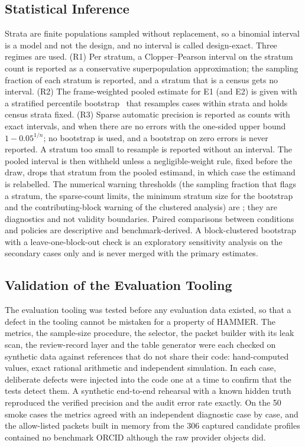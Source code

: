 \subsection{Statistical Inference}
\label{sec:inference}
Strata are finite populations sampled without replacement, so a binomial interval is a model and not the design, and no interval is called design-exact. Three regimes are used. (R1) Per stratum, a Clopper--Pearson interval on the stratum count is reported as a conservative superpopulation approximation; the sampling fraction of each stratum is reported, and a stratum that is a census gets no interval. (R2) The frame-weighted pooled estimate for E1 (and E2) is given with a stratified percentile bootstrap~\cite{efron1979bootstrap} that resamples cases within strata and holds census strata fixed. (R3) Sparse automatic precision is reported as counts with exact intervals, and when there are no errors with the one-sided upper bound $1-0.05^{1/n}$; no bootstrap is used, and a bootstrap on zero errors is never reported. A stratum too small to resample is reported without an interval. The pooled interval is then withheld unless a negligible-weight rule, fixed before the draw, drops that stratum from the pooled estimand, in which case the estimand is relabelled. The numerical warning thresholds (the sampling fraction that flags a stratum, the sparse-count limits, the minimum stratum size for the bootstrap and the contributing-block warning of the clustered analysis) are ; they are diagnostics and not validity boundaries. Paired comparisons between conditions and policies are descriptive and benchmark-derived. A block-clustered bootstrap with a leave-one-block-out check is an exploratory sensitivity analysis on the secondary cases only and is never merged with the primary estimates.

\subsection{Validation of the Evaluation Tooling}
\label{sec:validation}
The evaluation tooling was tested before any evaluation data existed, so that a defect in the tooling cannot be mistaken for a property of HAMMER. The metrics, the sample-size procedure, the selector, the packet builder with its leak scan, the review-record layer and the table generator were each checked on synthetic data against references that do not share their code: hand-computed values, exact rational arithmetic and independent simulation. In each case, deliberate defects were injected into the code one at a time to confirm that the tests detect them. A synthetic end-to-end rehearsal with a known hidden truth reproduced the verified precision and the audit error rate exactly. On the 50 smoke cases the metrics agreed with an independent diagnostic case by case, and the allow-listed packets built in memory from the 306 captured candidate profiles contained no benchmark ORCID although the raw provider objects did.

